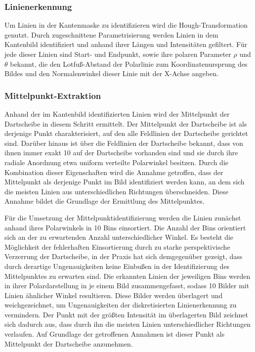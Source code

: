 \subsubsection{Linienerkennung}
\label{sec:impl:cv:lines:erkennung}

Um Linien in der Kantenmaske zu identifizieren wird die Hough-Transformation genutzt. Durch zugeschnittene Parametrisierung werden Linien in dem Kantenbild identifiziert und anhand ihrer Längen und Intensitäten gefiltert. Für jede dieser Linien sind Start- und Endpunkt, sowie ihre polaren Parameter $\rho$ und $\theta$ bekannt, die den Lotfuß-Abstand der Polarlinie zum Koordinatenursprung des Bildes und den Normalenwinkel dieser Linie mit der X-Achse angeben.

\subsubsection{Mittelpunkt-Extraktion}
\label{sec:impl:cv:lines:midpoint}

Anhand der im Kantenbild identifizierten Linien wird der Mittelpunkt der Dartscheibe in diesem Schritt ermittelt. Der Mittelpunkt der Dartscheibe ist als derjenige Punkt charakterisiert, auf den alle Feldlinien der Dartscheibe gerichtet sind. Darüber hinaus ist über die Feldlinien der Dartscheibe bekannt, dass von ihnen immer exakt 10 auf der Dartscheibe vorhanden sind und sie durch ihre radiale Anordnung etwa uniform verteilte Polarwinkel besitzen. Durch die Kombination dieser Eigenschaften wird die Annahme getroffen, dass der Mittelpunkt als derjenige Punkt im Bild identifiziert werden kann, an dem sich die meisten Linien aus unterschiedlichen Richtungen überschneiden. Diese Annahme bildet die Grundlage der Ermittlung des Mittelpunktes.

Für die Umsetzung der Mittelpunktidentifizierung werden die Linien zunächst anhand ihres Polarwinkels in 10 Bins einsortiert. Die Anzahl der Bins orientiert sich an der zu erwartenden Anzahl unterschiedlicher Winkel. Es besteht die Möglichkeit der fehlerhaften Einsortierung durch zu starke perspektivische Verzerrung der Dartscheibe, in der Praxis hat sich demgegenüber gezeigt, dass durch derartige Ungenauigkeiten keine Einbußen in der Identifizierung des Mittelpunktes zu erwarten sind. Die erkannten Linien der jeweiligen Bins werden in ihrer Polardarstellung in je einem Bild zusammengefasst, sodass 10 Bilder mit Linien ähnlicher Winkel resultieren. Diese Bilder werden überlagert und weichgezeichnet, um Ungenauigkeiten der diskretisierten Linienerkennung zu vermindern. Der Punkt mit der größten Intensität im überlagerten Bild zeichnet sich dadurch aus, dass durch ihn die meisten Linien unterschiedlicher Richtungen verlaufen. Auf Grundlage der getroffenen Annahmen ist dieser Punkt als Mittelpunkt der Dartscheibe anzunehmen.

